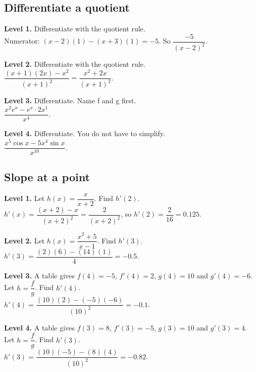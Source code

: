 \documentclass[11pt]{article}
\begin{document}
\subsection*{Differentiate a quotient}
\noindent\textbf{Level 1.} Differentiate with the quotient rule.\\  \quad Numerator: $(x-2)(1)-(x+3)(1)=-5$. So $\dfrac{-5}{(x-2)^{2}}$.\par\medskip
\noindent\textbf{Level 2.} Differentiate with the quotient rule.\\  \quad $\dfrac{(x+1)(2x)-x^{2}}{(x+1)^{2}}=\dfrac{x^{2}+2x}{(x+1)^{2}}$.\par\medskip
\noindent\textbf{Level 3.} Differentiate. Name f and g first.\\  \quad $\dfrac{x^{2}e^{x}-e^{x}\cdot2x^{1}}{x^{4}}$.\par\medskip
\noindent\textbf{Level 4.} Differentiate. You do not have to simplify.\\  \quad $\dfrac{x^{5}\cos x-5x^{4}\sin x}{x^{10}}$.\par\medskip
\subsection*{Slope at a point}
\noindent\textbf{Level 1.} Let $h(x)=\dfrac{x}{x+2}$. Find $h'(2)$.\\  \quad $h'(x)=\dfrac{(x+2)-x}{(x+2)^{2}}=\dfrac{2}{(x+2)^{2}}$, so $h'(2)=\dfrac{2}{16}=0.125$.\par\medskip
\noindent\textbf{Level 2.} Let $h(x)=\dfrac{x^{2}+5}{x-1}$. Find $h'(3)$.\\  \quad $h'(3)=\dfrac{(2)(6)-(14)(1)}{4}=-0.5$.\par\medskip
\noindent\textbf{Level 3.} A table gives $f(4)=-5$, $f'(4)=2$, $g(4)=10$ and $g'(4)=-6$. Let $h=\dfrac{f}{g}$. Find $h'(4)$.\\  \quad $h'(4)=\dfrac{(10)(2)-(-5)(-6)}{(10)^{2}}=-0.1$.\par\medskip
\noindent\textbf{Level 4.} A table gives $f(3)=8$, $f'(3)=-5$, $g(3)=10$ and $g'(3)=4$. Let $h=\dfrac{f}{g}$. Find $h'(3)$.\\  \quad $h'(3)=\dfrac{(10)(-5)-(8)(4)}{(10)^{2}}=-0.82$.\par\medskip
\end{document}
